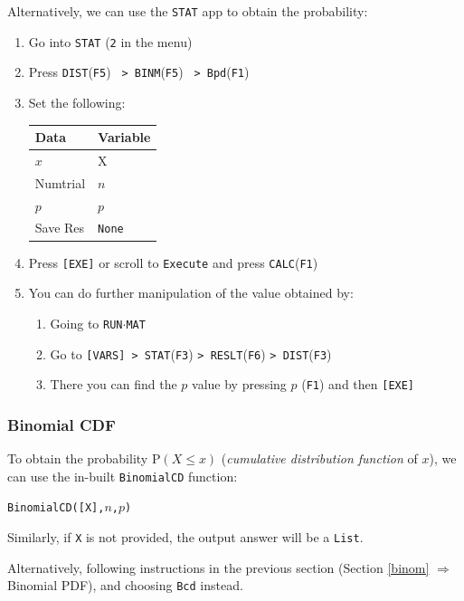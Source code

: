 \documentclass[a5paper,draft]{memoir}
\def\code#1{\texttt{#1}}
\def\runmat{\code{RUN$\cdot$MAT} }
\def\Fone{(\code{F1}) }
\def\Fthree{(\code{F3}) }
\def\Ffive{(\code{F5}) }
\def\Fsix{(\code{F6}) }
\newcommand{\addtoindex}[1]{#1\index{#1}}
\begin{document}
Alternatively, we can use the \code{STAT} app to obtain the probability:
\begin{enumerate}
	\item Go into \code{STAT} (\code{2} in the menu)
	\item Press \code{DIST}\Ffive\code{ > BINM}\Ffive\code{ > Bpd}\Fone
	\item Set the following:
	\begin{center}
		\setlength{\tabcolsep}{10pt}
		\renewcommand{\arraystretch}{1.1}
		\begin{tabular}{|l|l|}
			\hline
			Data		& Variable \\
			\hline
			$x$			& X \\
			\hline
			Numtrial	& $n$ \\
			\hline
			$p$			& $p$ \\
			\hline
			Save Res	& \code{None} \\
			\hline
		\end{tabular}
	\end{center}
	\item Press \code{[EXE]} or scroll to \code{Execute} and press \code{CALC}\Fone
	\item You can do further manipulation of the value obtained by:
	\begin{enumerate}
		\item Going to \runmat
		\item Go to \code{[VARS] > STAT}\Fthree\code{> RESLT}\Fsix\code{> DIST}\Fthree
		\item There you can find the $p$ value by pressing $p$ \Fone and then \code{[EXE]}
	\end{enumerate} 
\end{enumerate}

\subsubsection{Binomial CDF}

To obtain the probability $\textrm{P}(X \leq x)$ (\textit{cumulative distribution function} of $x$), we can use the in-built \code{\addtoindex{BinomialCD}} function:

\begin{center}
	\code{BinomialCD([X],$n$,$p$)}
\end{center}

Similarly, if \code{X} is not provided, the output answer will be a \code{List}.

Alternatively, following instructions in the previous section (Section \ref{binom} $\Rightarrow$ Binomial PDF), and choosing \code{Bcd} instead. 
\end{document}
